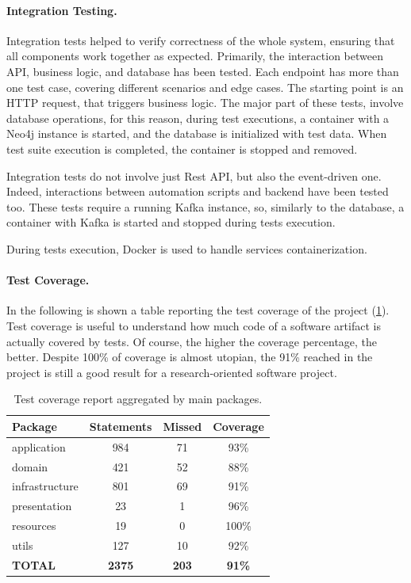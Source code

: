 \documentclass[12pt,a4paper,openright,twoside]{book}
\begin{document}
\paragraph{Integration Testing.}

Integration tests helped to verify correctness of the whole system, ensuring that all components work together as expected.
%
Primarily, the interaction between API, business logic, and database has been tested.
%
Each endpoint has more than one test case, covering different scenarios and edge cases.
%
The starting point is an HTTP request, that triggers business logic.
%
The major part of these tests, involve database operations, for this reason, during test executions, a container with a Neo4j instance is started, and the database is initialized with test data.
%
When test suite execution is completed, the container is stopped and removed.

Integration tests do not involve just Rest API, but also the event-driven one.
%
Indeed, interactions between automation scripts and backend have been tested too.
%
These tests require a running Kafka instance, so, similarly to the database, a container with Kafka is started and stopped during tests execution.

During tests execution, Docker is used to handle services containerization.


\paragraph{Test Coverage.}

In the following is shown a table reporting the test coverage of the project (\cref{tab:coverage}).
%
Test coverage is useful to understand how much code of a software artifact is actually covered by tests.
%
Of course, the higher the coverage percentage, the better.
%
Despite 100\% of coverage is almost utopian, the 91\% reached in the project is still a good result for a research-oriented software project.

\begin{table}
    \centering
    \begin{tabular}{lccc}
        \toprule
        \textbf{Package} & \textbf{Statements} & \textbf{Missed} & \textbf{Coverage} \\
        \midrule
        application   & 984  & 71  & 93\% \\
        domain        & 421  & 52  & 88\% \\
        infrastructure & 801  & 69  & 91\% \\
        presentation  & 23  & 1   & 96\% \\
        resources    & 19  & 0   & 100\% \\
        utils        & 127 & 10 &  92\% \\ 
        \midrule
        \textbf{TOTAL} & \textbf{2375} & \textbf{203} & \textbf{91\%} \\
        \bottomrule
    \end{tabular}
    \caption{Test coverage report aggregated by main packages.}
    \label{tab:coverage}
\end{table}
\end{document}
